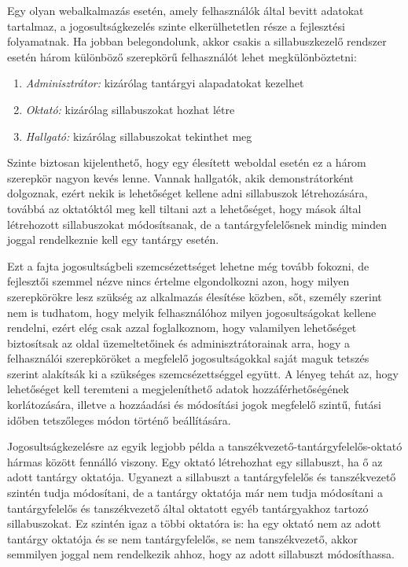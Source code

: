 \documentclass[hidelinks, 12pt, a4paper]{report}
\begin{document}
Egy olyan webalkalmazás esetén, amely felhasználók által bevitt adatokat tartalmaz, a jogosultságkezelés szinte elkerülhetetlen része a fejlesztési folyamatnak. Ha jobban belegondolunk, akkor csakis a sillabuszkezelő rendszer esetén három különböző szerepkörű felhasználót lehet megkülönböztetni:
\begin{enumerate}
\item \emph{Adminisztrátor:} kizárólag tantárgyi alapadatokat kezelhet
\item \emph{Oktató:} kizárólag sillabuszokat hozhat létre
\item \emph{Hallgató:} kizárólag sillabuszokat tekinthet meg
\end{enumerate}
Szinte biztosan kijelenthető, hogy egy élesített weboldal esetén ez a három szerepkör nagyon kevés lenne. Vannak hallgatók, akik demonstrátorként dolgoznak, ezért nekik is lehetőséget kellene adni sillabuszok létrehozására, továbbá az oktatóktól meg kell tiltani azt a lehetőséget, hogy mások által létrehozott sillabuszokat módosítsanak, de a tantárgyfelelősnek mindig minden joggal rendelkeznie kell egy tantárgy esetén. 

Ezt a fajta jogosultságbeli szemcsézettséget lehetne még tovább fokozni, de fejlesztői szemmel nézve nincs értelme elgondolkozni azon, hogy milyen szerepkörökre lesz szükség az alkalmazás élesítése közben, sőt, személy szerint nem is tudhatom, hogy melyik felhasználóhoz milyen jogosultságokat kellene rendelni, ezért elég csak azzal foglalkoznom, hogy valamilyen lehetőséget biztosítsak az oldal üzemeltetőinek és adminisztrátorainak arra, hogy a felhasználói szerepköröket a megfelelő jogosultságokkal saját maguk tetszés szerint alakítsák ki a szükséges szemcsézettséggel együtt. A lényeg tehát az, hogy lehetőséget kell teremteni a megjeleníthető adatok hozzáférhetőségének korlátozására, illetve a hozzáadási és módosítási jogok megfelelő szintű, futási időben tetszőleges módon történő beállítására.

Jogosultságkezelésre az egyik legjobb példa a tanszékvezető-tantárgyfelelős-oktató hármas között fennálló viszony. Egy oktató létrehozhat egy sillabuszt, ha ő az adott tantárgy oktatója. Ugyanezt a sillabuszt a tantárgyfelelős és tanszékvezető szintén tudja módosítani, de a tantárgy oktatója már nem tudja módosítani a tantárgyfelelős és tanszékvezető által oktatott egyéb tantárgyakhoz tartozó sillabuszokat. Ez szintén igaz a többi oktatóra is: ha egy oktató nem az adott tantárgy oktatója és se nem tantárgyfelelős, se nem tanszékvezető, akkor semmilyen joggal nem rendelkezik ahhoz, hogy az adott sillabuszt módosíthassa.
\end{document}
